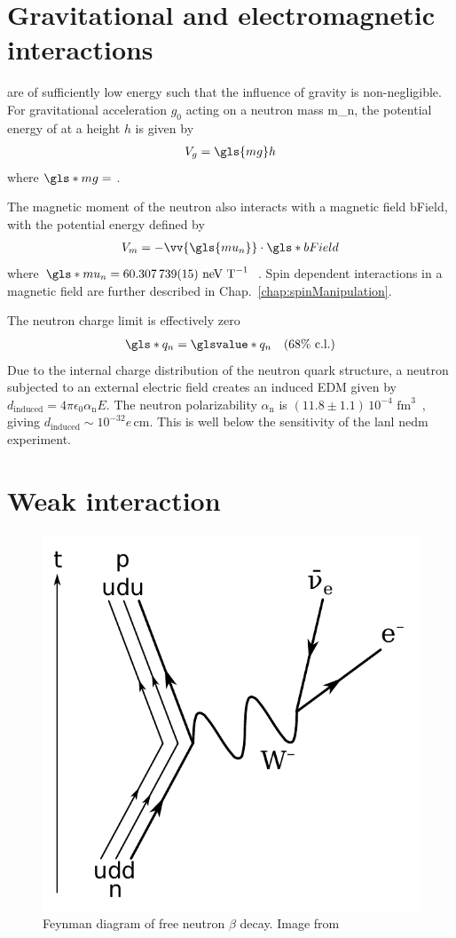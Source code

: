 
\section{Gravitational and electromagnetic interactions}\label{sec:ucn_grav_em}


\ucn are of sufficiently low energy such that the influence of gravity is non-negligible. For gravitational acceleration $g_0$ acting on a neutron mass \gls{m_n}, the potential energy of at a height $h$ is given by
%
\begin{gather}
    V_g = \gls{mg}h
\end{gather}
%
where $\gls*{mg}=$ \cite{codata_2018}.

The magnetic moment of the neutron also interacts with a magnetic field \gls*{bField}, with the potential energy defined by
%
\begin{gather}
    V_m = - \vv{\gls{mu_n}}\cdot \gls*{bField}
\end{gather}
%
where $\gls*{mu_n}=60.307\,739(15)\text{ neV T}^{-1}$~\cite{codata_2018}. Spin dependent interactions in a magnetic field are further described in Chap.~\ref{chap:spinManipulation}.

The neutron charge limit is effectively zero~\cite{baumann_neutron_charge}
%
\begin{gather}
    \gls*{q_n}=\glsvalue*{q_n}\quad(68 \% \text{ c.l.})
\end{gather}
%
Due to the internal charge distribution of the neutron quark structure, a neutron subjected to an external electric field creates an induced EDM given by $d_\text{induced}=4\pi \epsilon_0 \alpha_\text{n} E$. The neutron polarizability $\alpha_\text{n}$ is $(11.8\pm 1.1)\,10^{-4}\text{ fm}^3$~\cite{pdg2022}, giving $d_\text{induced}\sim 10^{-32}e\,\text{cm}$. This is well below the sensitivity of the \acrshort*{lanl} \acrshort*{nedm} experiment.



\section{Weak interaction}\label{sec:weak_interaction}


\begin{figure}[htp]
    \centering
    \includegraphics[width=0.3 \textwidth]{figures/beta_negative_decay.pdf}
    \caption[Feynman diagram of free neutron $\beta$ decay]
    {Feynman diagram of free neutron $\beta$ decay. Image from \cite{beta_decay_fig}}
    \label{fig:beta_decay}
\end{figure}

